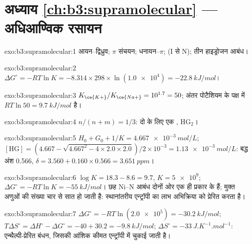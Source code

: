 \section*{अध्याय \ref{ch:b3:supramolecular} --- अधिआण्विक रसायन}

\begin{solution}{exo:b3:supramolecular:1}
आयन--द्विध्रुव; $\pi$ संचयन; धनायन--$\pi$;  (I से N); तीन हाइड्रोजन आबंध।
\end{solution}

\begin{solution}{exo:b3:supramolecular:2}
$\Delta G^\circ = -RT\ln K = -8.314 \times 298 \times \ln(\num{1.0e4}) = \qty{-22.8}{kJ/mol}$।
\end{solution}

\begin{solution}{exo:b3:supramolecular:3}
$K_{\ce{K+}}/K_{\ce{Na+}} = 10^{1.7} = 50$; अंतर पोटैशियम के पक्ष में $RT\ln 50 = \qty{9.7}{kJ/mol}$ है।
\end{solution}

\begin{solution}{exo:b3:supramolecular:4}
$n/(n + m) = 1/3$: दो  के लिए एक , $\mathrm{HG_2}$।
\end{solution}

\begin{solution}{exo:b3:supramolecular:5}
$H_0 + G_0 + 1/K = \qty{4.667e-3}{mol/L}$; $[\mathrm{HG}] = (4.667 - \sqrt{4.667^2 - 4 \times 2.0 \times 2.0})/2 \times 10^{-3} = \qty{1.13e-3}{mol/L}$: बद्ध
अंश 0.566, $\delta = 3.560 + 0.160 \times 0.566 = \qty{3.651}{ppm}$।
\end{solution}

\begin{solution}{exo:b3:supramolecular:6}
$\log K = 18.3 - 8.6 = 9.7$, $K = \num{5e9}$; $\Delta G^\circ = -RT\ln K = \qty{-55}{kJ/mol}$। छह Ni--N आबंध दोनों ओर
एक ही प्रकार के हैं; मुक्त अणुओं की संख्या चार से
सात हो जाती है: स्थानांतरीय एन्ट्रॉपी का लाभ अभिक्रिया को प्रेरित करता है।
\end{solution}

\begin{solution}{exo:b3:supramolecular:7}
$\Delta G^\circ = -RT\ln(\num{2.0e5}) = \qty{-30.2}{kJ/mol}$; $T\Delta S^\circ = \Delta H^\circ - \Delta G^\circ = -40 + 30.2 = \qty{-9.8}{kJ/mol}$;
$\Delta S^\circ = \qty{-33}{J.K^{-1}.mol^{-1}}$: एन्थैल्पी-प्रेरित बंधन, जिसकी आंशिक कीमत एन्ट्रॉपी में चुकाई जाती है।
\end{solution}

